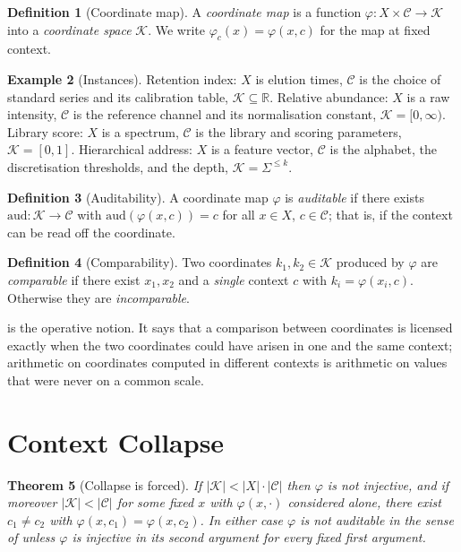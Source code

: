\documentclass[11pt,a4paper]{article}
\newtheorem{theorem}{Theorem}[section]
\theoremstyle{definition}
\newtheorem{definition}[theorem]{Definition}
\newtheorem{example}[theorem]{Example}
\theoremstyle{remark}
\newcommand{\Crd}{\mathcal{K}}               %
\newcommand{\Ctx}{\mathcal{C}}               %
\newcommand{\aud}{\mathrm{aud}}
\begin{document}
\begin{definition}[Coordinate map]\label{def:coord}
A \emph{coordinate map} is a function $\varphi : X \times \Ctx \to \Crd$
into a \emph{coordinate space} $\Crd$. We write
$\varphi_c(x) = \varphi(x,c)$ for the map at fixed context.
\end{definition}

\begin{example}[Instances]\label{ex:instances}
Retention index: $X$ is elution times, $\Ctx$ is the choice of standard
series and its calibration table, $\Crd \subseteq \mathbb{R}$. Relative
abundance: $X$ is a raw intensity, $\Ctx$ is the reference channel and
its normalisation constant, $\Crd = [0,\infty)$. Library score: $X$ is a
spectrum, $\Ctx$ is the library and scoring parameters, $\Crd = [0,1]$.
Hierarchical address: $X$ is a feature vector, $\Ctx$ is the alphabet,
the discretisation thresholds, and the depth, $\Crd = \Sigma^{\leq k}$.
\end{example}

\begin{definition}[Auditability]\label{def:audit}
A coordinate map $\varphi$ is \emph{auditable} if there exists
$\aud : \Crd \to \Ctx$ with $\aud(\varphi(x,c)) = c$ for all
$x \in X$, $c \in \Ctx$; that is, if the context can be read off the
coordinate.
\end{definition}

\begin{definition}[Comparability]\label{def:comparable}
Two coordinates $k_1,k_2 \in \Crd$ produced by $\varphi$ are
\emph{comparable} if there exist $x_1,x_2$ and a \emph{single} context
$c$ with $k_i = \varphi(x_i,c)$. Otherwise they are \emph{incomparable}.
\end{definition}

 is the operative notion. It says that a comparison
between coordinates is licensed exactly when the two coordinates could
have arisen in one and the same context; arithmetic on coordinates
computed in different contexts is arithmetic on values that were never
on a common scale.

\section{Context Collapse}
\label{sec:collapse}

\begin{theorem}[Collapse is forced]\label{thm:collapse}
If $|\Crd| < |X| \cdot |\Ctx|$ then $\varphi$ is not injective, and if
moreover $|\Crd| < |\Ctx|$ for some fixed $x$ with $\varphi(x,\cdot)$
considered alone, there exist $c_1 \neq c_2$ with
$\varphi(x,c_1) = \varphi(x,c_2)$. In either case $\varphi$ is not
auditable in the sense of  unless $\varphi$ is injective
in its second argument for every fixed first argument.
\end{theorem}
\end{document}
